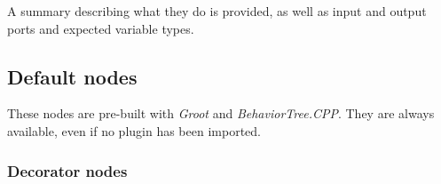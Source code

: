 \documentclass[a4paper,12pt]{article}
\begin{document}
A summary describing what they do is provided, as well as input and output ports and expected variable types.


\subsection{Default nodes}
\label{subsec:default-nodes}

These nodes are pre-built with \textit{Groot} and \textit{BehaviorTree.CPP}. They are always available, even if no plugin has been imported.

\subsubsection{Decorator nodes}
\label{subsubsec:default-nodes-decorators}
\end{document}
